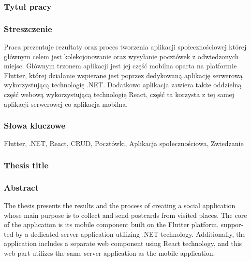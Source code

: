 \documentclass[a4paper,twoside,12pt]{book}
\begin{document}


\cleardoublepage

\rmfamily\normalfont
\pagestyle{empty}



\subsubsection*{Tytuł pracy} 
\Title

\subsubsection*{Streszczenie}  
Praca prezentuje rezultaty oraz proces tworzenia aplikacji społecznościowej której głównym celem jest kolekcjonowanie oraz wysyłanie pocztówek z odwiedzonych miejsc. Głównym trzonem aplikacji jest jej część mobilna oparta na platformie Flutter, której działanie wspierane jest poprzez dedykowaną aplikację serwerową wykorzystującą technologię .NET. Dodatkowo aplikacja zawiera także oddzielną część webową wykorzystującą technologię React, część ta korzysta z tej samej aplikacji serwerowej co aplikacja mobilna.

\subsubsection*{Słowa kluczowe} 
Flutter, .NET, React, CRUD, Pocztówki, Aplikacja społecznościowa, Zwiedzanie

\subsubsection*{Thesis title} 
\begin{otherlanguage}{british}
\TitleAlt
\end{otherlanguage}

\subsubsection*{Abstract} 
\begin{otherlanguage}{british}
The thesis presents the results and the process of creating a social application whose main purpose is to collect and send postcards from visited places. The core of the application is its mobile component built on the Flutter platform, supported by a dedicated server application utilizing .NET technology. Additionally, the application includes a separate web component using React technology, and this web part utilizes the same server application as the mobile application.
\end{otherlanguage}
\end{document}
